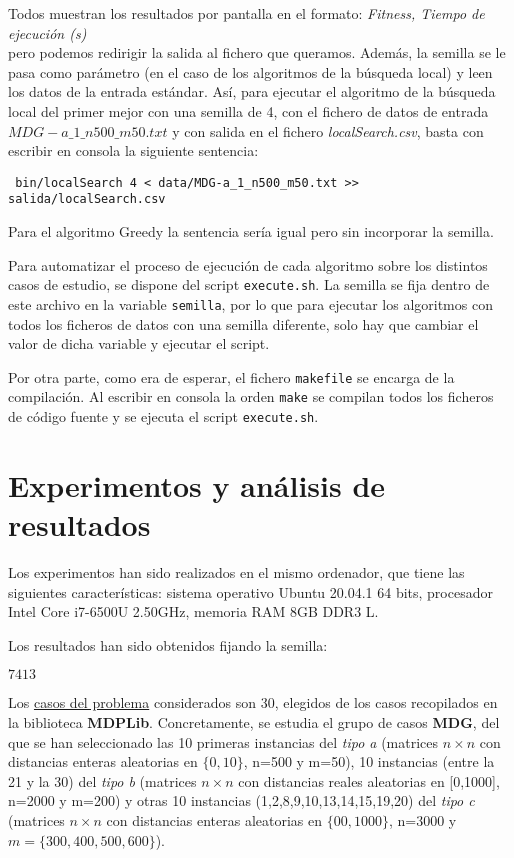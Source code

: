 \documentclass[11pt,a4paper]{article}
\begin{document}
	Todos muestran los resultados por pantalla en el formato: \textit{Fitness, Tiempo de ejecución (s)}\\ pero podemos redirigir la salida al fichero que queramos. Además, la semilla se le pasa como parámetro (en el caso de los algoritmos de la búsqueda local) y leen los datos  de la entrada estándar. Así, para ejecutar el algoritmo de la búsqueda local del primer mejor con una semilla de 4, con el fichero de datos de entrada $MDG-a\_1\_n500\_m50.txt$ y con salida en el fichero \textit{localSearch.csv}, basta con escribir en consola la siguiente sentencia:
	
	 \lstinline| bin/localSearch 4 < data/MDG-a_1_n500_m50.txt >> salida/localSearch.csv|
	
	Para el algoritmo Greedy la sentencia sería igual pero sin incorporar la semilla. 
	
	Para automatizar el proceso de ejecución de cada algoritmo sobre los distintos casos de estudio, se dispone del script \lstinline|execute.sh|. La semilla se fija dentro de este archivo en la variable \lstinline|semilla|, por lo que para ejecutar los algoritmos con todos los ficheros de datos con una semilla diferente, solo hay que cambiar el valor de dicha variable y ejecutar el script. 
	
	Por otra parte, como era de esperar, el fichero \lstinline|makefile| se encarga de la compilación. Al escribir en consola la orden \lstinline|make| se compilan todos los ficheros de código fuente y se ejecuta el script \lstinline|execute.sh|. 
	
	\section{Experimentos y análisis de resultados}
	
	Los experimentos han sido realizados en el mismo ordenador, que tiene las siguientes características: sistema operativo Ubuntu 20.04.1 64 bits, procesador Intel Core i7-6500U 2.50GHz, memoria RAM 8GB DDR3 L.
	
	Los resultados han sido obtenidos fijando la semilla:
	\vspace{-5mm} \begin{center}{ $ 7413 $}\end{center}
 \vspace{-4mm}
	
	Los \underline{casos del problema} considerados son 30, elegidos de los casos recopilados en la biblioteca \textbf{MDPLib}. Concretamente, se estudia el grupo de casos \textbf{MDG}, del que se han seleccionado las 10 primeras instancias del \textit{tipo a} (matrices $n\times n$ con distancias enteras aleatorias en $ \{0,10\} $, n=500 y m=50), 10 instancias (entre la 21 y la 30) del \textit{tipo b} (matrices $n\times n$ con distancias reales aleatorias en [0,1000], n=2000 y m=200) y otras 10 instancias (1,2,8,9,10,13,14,15,19,20) del \textit{tipo c} (matrices $n\times n$ con distancias enteras aleatorias en $ \{00,1000\} $, n=3000 y\\ $ m=\{300,400,500,600\} $).
	
\end{document}
